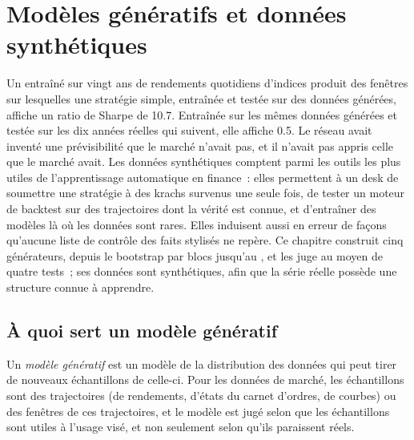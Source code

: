 \chapter{Modèles génératifs et données synthétiques}\label{ch:ml:generative-models-and-synthetic-data}

Un  entraîné sur vingt ans de rendements quotidiens d'indices produit des fenêtres sur lesquelles une stratégie simple,
entraînée et testée sur des données générées, affiche un ratio de Sharpe de 10.7. Entraînée sur les mêmes données générées et
testée sur les dix années réelles qui suivent, elle affiche 0.5. Le réseau avait inventé une prévisibilité que le marché n'avait pas,
et il n'avait pas appris celle que le marché avait. Les données synthétiques comptent parmi les outils les plus utiles de l'apprentissage automatique en
finance~: elles permettent à un desk de soumettre une stratégie à des krachs survenus une seule fois, de tester un moteur de backtest sur des trajectoires dont la vérité est connue,
et d'entraîner des modèles là où les données sont rares. Elles induisent aussi en erreur de façons qu'aucune liste de contrôle des faits stylisés ne repère. Ce chapitre
construit cinq générateurs, depuis le bootstrap par blocs jusqu'au , et les juge au moyen de quatre tests~; ses données sont
synthétiques, afin que la série réelle possède une structure connue à apprendre.

\section{À quoi sert un modèle génératif}

\begin{definition}\label{def:ml:generative-models-and-synthetic-data:gen}
Un \emph{modèle génératif} est un modèle de la distribution des données qui peut tirer de nouveaux échantillons
de celle-ci. Pour les données de marché, les échantillons sont des trajectoires (de rendements, d'états du carnet d'ordres, de courbes) ou des fenêtres de ces trajectoires, et le modèle est jugé
selon que les échantillons sont utiles à l'usage visé, et non seulement selon qu'ils paraissent réels.
\end{definition}

